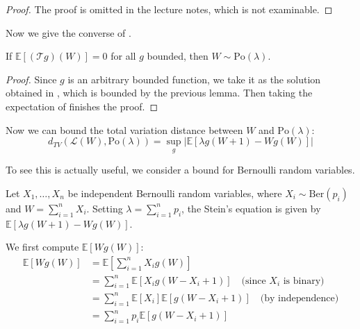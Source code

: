 \documentclass{article}
\begin{document}
\begin{proof}
    The proof is omitted in the lecture notes, which is not examinable. 
\end{proof}

Now we give the converse of .

\begin{proposition}\label{prop: direction2 poisson}
    If $\mathbb{E}[(\mathcal{T}g)(W)]=0$ for all $g$ bounded, then $W\sim \text{Po}(\lambda)$.
\end{proposition}

\begin{proof}
    Since $g$ is an arbitrary bounded function, we take it as the solution obtained in , which is bounded by the previous lemma. Then taking the expectation of  finishes the proof.
\end{proof}

Now we can bound the total variation distance between $W$ and $\text{Po}(\lambda)$:
\begin{equation}\label{eq:poisson_stein_total_variation}
    d_{TV}(\mathcal{L}(W), \text{Po}(\lambda)) = \sup_{g} |\mathbb{E}[\lambda g(W+1) - Wg(W)]|
\end{equation}

To see this is actually useful, we consider a bound for Bernoulli random variables. 


    Let $X_1, \ldots, X_n$ be independent Bernoulli random variables, where $X_i \sim \text{Ber}(p_i)$ and $W = \sum_{i=1}^n X_i$. Setting $\lambda = \sum_{i=1}^n p_i$, the Stein's equation is given by $\mathbb{E}[\lambda g(W+1) - Wg(W)]$.    

    We first compute $\mathbb{E}[Wg(W)]$:
    \begin{align*}
        \mathbb{E}[Wg(W)] &= \mathbb{E}[\sum_{i=1}^n X_i g(W)]\\
        &= \sum_{i=1}^n \mathbb{E}[X_i g(W - X_i + 1)] \quad \text{(since $X_i$ is binary)}
        \\
        &= \sum_{i=1}^n \mathbb{E}[X_i] \mathbb{E}[g(W - X_i + 1)] \quad \text{(by independence)}\\
        &= \sum_{i=1}^n p_i \mathbb{E}[g(W - X_i + 1)]
    \end{align*}
\end{document}

